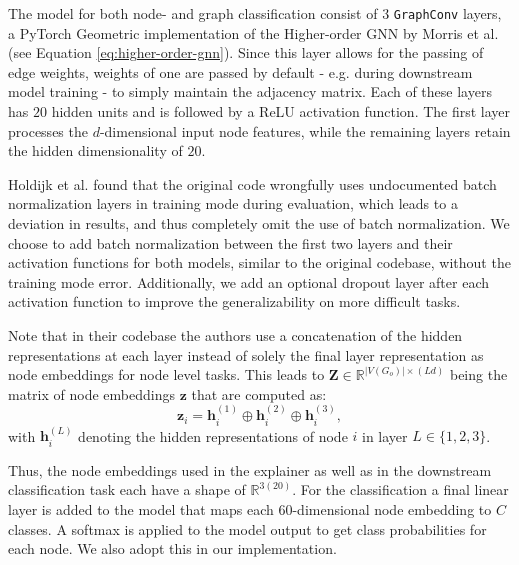 The model for both node- and graph classification consist of $3$ \lstinline|GraphConv| layers, a PyTorch Geometric implementation of the Higher-order GNN by Morris et al. \cite{morris2019weisfeiler} (see Equation \ref{eq:higher-order-gnn}). Since this layer allows for the passing of edge weights, weights of one are passed by default - e.g. during downstream model training - to simply maintain the adjacency matrix. Each of these layers has $20$ hidden units and is followed by a ReLU activation function. The first layer processes the $d$-dimensional input node features, while the remaining layers retain the hidden dimensionality of $20$.

Holdijk et al. \cite{holdijk2021re} found that the original code wrongfully uses undocumented batch normalization layers in training mode during evaluation, which leads to a deviation in results, and thus completely omit the use of batch normalization. We choose to add batch normalization between the first two layers and their activation functions for both models, similar to the original codebase, without the training mode error. Additionally, we add an optional dropout layer after each activation function to improve the generalizability on more difficult tasks. \bigskip


Note that in their codebase the authors use a concatenation of the hidden representations at each layer instead of solely the final layer representation as node embeddings for node level tasks.
This leads to $\mathbf{Z} \in \mathbb{R}^{|V(G_o)|\times (Ld)}$ being the matrix of node embeddings $\mathbf{z}$ that are computed as:
\begin{equation}
    \mathbf{z}_i = \mathbf{h}^{(1)}_i \oplus \mathbf{h}^{(2)}_i \oplus \mathbf{h}^{(3)}_i,
\end{equation}
with $\mathbf{h}^{(L)}_i$ denoting the hidden representations of node $i$ in layer $L \in \{1,2,3\}$.\bigskip


Thus, the node embeddings used in the explainer as well as in the downstream classification task each have a shape of $\mathbb{R}^{3(20)}$. For the classification a final linear layer is added to the model that maps each $60$-dimensional node embedding to $C$ classes. A softmax is applied to the model output to get class probabilities for each node. We also adopt this in our implementation.

